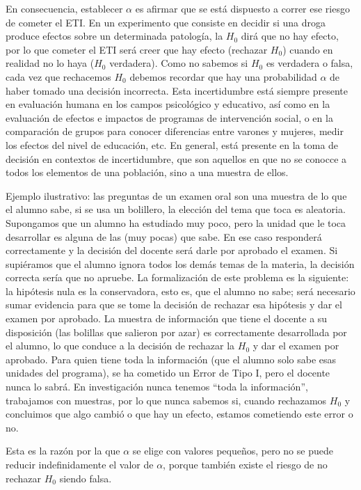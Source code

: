 \documentclass[]{book}
\begin{document}
En consecuencia, establecer \(\alpha\) es afirmar que se está dispuesto a correr
ese riesgo de cometer el ETI. En un experimento que consiste en decidir
si una droga produce efectos sobre un determinada patología, la \(H_{0}\) dirá
que no hay efecto, por lo que cometer el ETI será creer que hay efecto
(rechazar \(H_{0}\)) cuando en realidad no lo haya (\(H_{0}\) verdadera). Como no
sabemos si \(H_{0}\) es verdadera o falsa, cada vez que rechacemos \(H_{0}\)
debemos recordar que hay una probabilidad \(\alpha\) de haber tomado una decisión
incorrecta. Esta incertidumbre está siempre presente en evaluación humana en los campos psicológico y educativo, así como en la evaluación de efectos e impactos de programas de intervención social, o en la comparación de grupos para conocer diferencias entre varones y mujeres, medir los efectos del nivel de educación, etc. En general, está presente en la toma de decisión en contextos de incertidumbre, que son aquellos en que no se conocce a todos los elementos de una población, sino a una muestra de ellos.

Ejemplo ilustrativo: las preguntas de un examen oral son una muestra de
lo que el alumno sabe, si se usa un bolillero, la elección del tema que
toca es aleatoria. Supongamos que un alumno ha estudiado muy poco, pero
la unidad que le toca desarrollar es alguna de las (muy pocas) que sabe.
En ese caso responderá correctamente y la decisión del docente será
darle por aprobado el examen. Si supiéramos que el alumno ignora todos
los demás temas de la materia, la decisión correcta sería que no
apruebe. La formalización de este problema es la siguiente: la
hipótesis nula es la conservadora, esto es, que el alumno no sabe; será
necesario sumar evidencia para que se tome la decisión de rechazar esa
hipótesis y dar el examen por aprobado. La muestra de información que
tiene el docente a su disposición (las bolillas que salieron por azar)
es correctamente desarrollada por el alumno, lo que conduce a la
decisión de rechazar la \(H_{0}\) y dar el examen por aprobado. Para quien
tiene toda la información (que el alumno solo sabe esas unidades del
programa), se ha cometido un Error de Tipo I, pero el docente nunca lo
sabrá. En investigación nunca tenemos ``toda la información'', trabajamos
con muestras, por lo que nunca sabemos si, cuando rechazamos \(H_{0}\) y concluimos que algo cambió o que hay un efecto,
estamos cometiendo este error o no.

Esta es la razón por la que \(\alpha\) se elige con valores pequeños, pero no se
puede reducir indefinidamente el valor de \(\alpha\), porque también existe el riesgo de no rechazar \(H_{0}\) siendo falsa.
\end{document}
